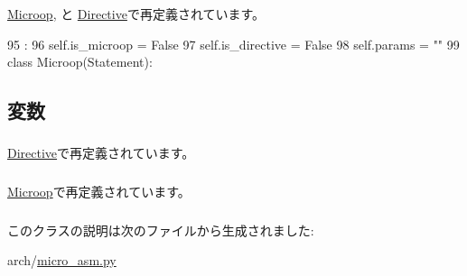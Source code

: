 \hyperlink{classmicro__asm_1_1Microop_ac775ee34451fdfa742b318538164070e}{Microop}, と \hyperlink{classmicro__asm_1_1Directive_ac775ee34451fdfa742b318538164070e}{Directive}で再定義されています。


\begin{DoxyCode}
95                       :
96         self.is_microop = False
97         self.is_directive = False
98         self.params = ""
99 
class Microop(Statement):
\end{DoxyCode}


\subsection{変数}
\hypertarget{classmicro__asm_1_1Statement_a7715b944fddfe15aad875fe3c226d81b}{
\subsubsection[{is\_\-directive}]{}}
\label{classmicro__asm_1_1Statement_a7715b944fddfe15aad875fe3c226d81b}


\hyperlink{classmicro__asm_1_1Directive_a7715b944fddfe15aad875fe3c226d81b}{Directive}で再定義されています。\hypertarget{classmicro__asm_1_1Statement_ad8d639c296a2174eaecfe07681b44d8d}{
\subsubsection[{is\_\-microop}]{}}
\label{classmicro__asm_1_1Statement_ad8d639c296a2174eaecfe07681b44d8d}


\hyperlink{classmicro__asm_1_1Microop_ad8d639c296a2174eaecfe07681b44d8d}{Microop}で再定義されています。\hypertarget{classmicro__asm_1_1Statement_a41000f175dc0115080e2a682cc06dbe9}{
\subsubsection[{params}]{}}
\label{classmicro__asm_1_1Statement_a41000f175dc0115080e2a682cc06dbe9}


このクラスの説明は次のファイルから生成されました:\begin{DoxyCompactItemize}
\item 
arch/\hyperlink{micro__asm_8py}{micro\_\-asm.py}\end{DoxyCompactItemize}
